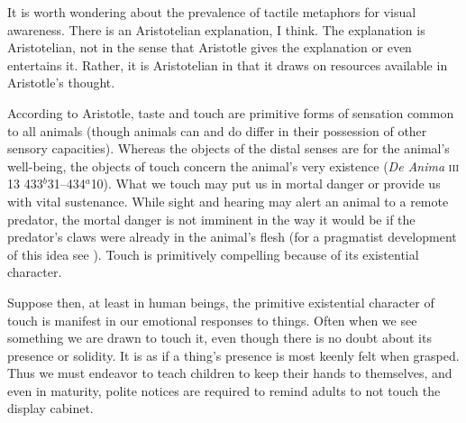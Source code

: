 It is worth wondering about the prevalence of tactile metaphors for visual awareness. There is an Aristotelian explanation, I think. The explanation is Aristotelian, not in the sense that Aristotle gives the explanation or even entertains it. Rather, it is Aristotelian in that it draws on resources available in Aristotle's thought.

According to Aristotle, taste and touch are primitive forms of sensation common to all animals (though animals can and do differ in their possession of other sensory capacities). Whereas the objects of the distal senses are for the animal's well-being, the objects of touch concern the animal's very existence (\emph{De Anima} \textsc{iii} 13 433\( ^{b} \)31--434\( ^{a} \)10). What we touch may put us in mortal danger or provide us with vital sustenance. While sight and hearing may alert an animal to a remote predator, the mortal danger is not imminent in the way it would be if the predator's claws were already in the animal's flesh (for a pragmatist development of this idea see \citealt[22--23]{Bergson:1912pi}). Touch is primitively compelling because of its existential character.

Suppose then, at least in human beings, the primitive existential character of touch is manifest in our emotional responses to things. Often when we see something we are drawn to touch it, even though there is no doubt about its presence or solidity. It is as if a thing's presence is most keenly felt when grasped. Thus we must endeavor to teach children to keep their hands to themselves, and even in maturity, polite notices are required to remind adults to not touch the display cabinet.

